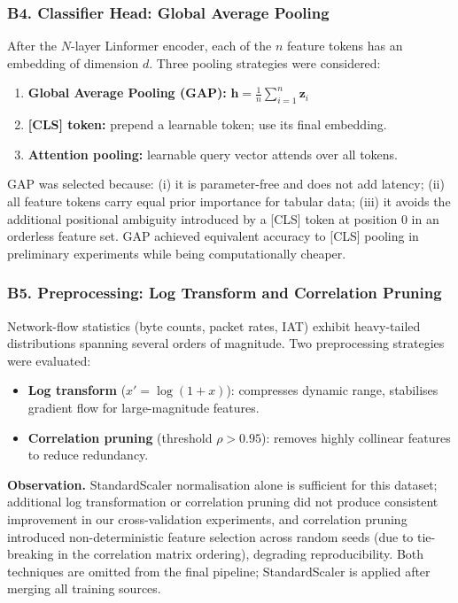 \subsubsection{B4. Classifier Head: Global Average Pooling}

After the $N$-layer Linformer encoder, each of the $n$ feature tokens has an
embedding of dimension $d$.
Three pooling strategies were considered:
\begin{enumerate}[noitemsep]
  \item \textbf{Global Average Pooling (GAP):} $\mathbf{h} = \frac{1}{n}\sum_{i=1}^n \mathbf{z}_i$
  \item \textbf{[CLS] token:} prepend a learnable token; use its final embedding.
  \item \textbf{Attention pooling:} learnable query vector attends over all tokens.
\end{enumerate}
GAP was selected because:
(i) it is parameter-free and does not add latency;
(ii) all feature tokens carry equal prior importance for tabular data;
(iii) it avoids the additional positional ambiguity introduced by a [CLS] token
at position 0 in an orderless feature set.
GAP achieved equivalent accuracy to [CLS] pooling in preliminary experiments
while being computationally cheaper.

\subsubsection{B5. Preprocessing: Log Transform and Correlation Pruning}

Network-flow statistics (byte counts, packet rates, IAT) exhibit heavy-tailed
distributions spanning several orders of magnitude.
Two preprocessing strategies were evaluated:

\begin{itemize}[noitemsep]
  \item \textbf{Log transform} ($x' = \log(1+x)$): compresses dynamic range,
    stabilises gradient flow for large-magnitude features.
  \item \textbf{Correlation pruning} (threshold $\rho > 0.95$): removes
    highly collinear features to reduce redundancy.
\end{itemize}

\textbf{Observation.}
StandardScaler normalisation alone is sufficient for this dataset; additional
log transformation or correlation pruning did not produce consistent
improvement in our cross-validation experiments, and correlation pruning
introduced non-deterministic feature selection across random seeds
(due to tie-breaking in the correlation matrix ordering), degrading
reproducibility.
Both techniques are omitted from the final pipeline; StandardScaler is applied
after merging all training sources.

